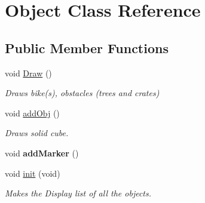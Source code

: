 \hypertarget{classObject}{\section{\-Object \-Class \-Reference}
\label{classObject}
}
\subsection*{\-Public \-Member \-Functions}
\begin{DoxyCompactItemize}
\item 
\hypertarget{classObject_ac469dbbd3cedec6a3e8f0d2172b7429e}{void \hyperlink{classObject_ac469dbbd3cedec6a3e8f0d2172b7429e}{\-Draw} ()}\label{classObject_ac469dbbd3cedec6a3e8f0d2172b7429e}

\begin{DoxyCompactList}\small\item\em \-Draws bike(s), obstacles (trees and crates) \end{DoxyCompactList}\item 
\hypertarget{classObject_a4e9e943d3a7353207c4b367f24eaa6d4}{void \hyperlink{classObject_a4e9e943d3a7353207c4b367f24eaa6d4}{add\-Obj} ()}\label{classObject_a4e9e943d3a7353207c4b367f24eaa6d4}

\begin{DoxyCompactList}\small\item\em \-Draws solid cube. \end{DoxyCompactList}\item 
\hypertarget{classObject_a415f1213df493e37f6eacb4173ee24c2}{void {\bfseries add\-Marker} ()}\label{classObject_a415f1213df493e37f6eacb4173ee24c2}

\item 
\hypertarget{classObject_a27e1e8844b2e46ae4992ff6e28a7ac47}{void \hyperlink{classObject_a27e1e8844b2e46ae4992ff6e28a7ac47}{init} (void)}\label{classObject_a27e1e8844b2e46ae4992ff6e28a7ac47}

\begin{DoxyCompactList}\small\item\em \-Makes the \-Display list of all the objects. \end{DoxyCompactList}\end{DoxyCompactItemize}
